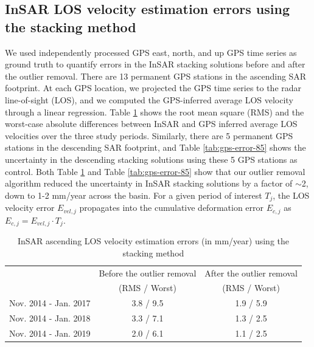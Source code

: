 \documentclass{utexasthesis}
\begin{document}
\subsection{InSAR LOS velocity estimation errors using the stacking method}
\label{sec:error-quant}
We used independently processed GPS east, north, and up GPS time series as ground truth to quantify errors in the InSAR stacking solutions before and after the outlier removal. There are 13 permanent GPS stations in the ascending SAR footprint. At each GPS location, we projected the GPS time series to the radar line-of-sight (LOS), and we computed the GPS-inferred average LOS velocity through a linear regression. Table \ref{tab:gps-error-78} shows the root mean square (RMS) and the worst-case absolute differences between InSAR and GPS inferred average LOS velocities over the three study periods. Similarly, there are 5 permanent GPS stations in the descending SAR footprint, and Table \ref{tab:gps-error-85} shows the uncertainty in the descending stacking solutions using these 5 GPS stations as control. Both Table \ref{tab:gps-error-78} and Table \ref{tab:gps-error-85} show that our outlier removal algorithm reduced the uncertainty in InSAR stacking solutions by a factor of $\sim$2, down to 1-2 mm/year across the basin. For a given period of interest $T_j$, the LOS velocity error $ E_{vel,j} $ propagates into the cumulative deformation error $ E_{c, j} $ as $ E_{c,j} = E_{vel,j} \cdot T_j $. 


\begin{table}
	\caption{InSAR ascending LOS velocity estimation errors (in mm/year) using the stacking method}
	\centering
	\begin{tabular}{|c|c|c|}
		\hline 
		& Before the outlier removal & After the outlier removal \\
		& (RMS / Worst) & (RMS / Worst) \\
		\hline
		Nov. 2014 - Jan. 2017 & 3.8 / 9.5         & 1.9 / 5.9       \\\hline
		Nov. 2014 - Jan. 2018 & 3.3 / 7.1         & 1.3 / 2.5       \\\hline
		Nov. 2014 - Jan. 2019 & 2.0 / 6.1         & 1.1 / 2.5       \\\hline                
	\end{tabular}
	\label{tab:gps-error-78}
\end{table}
\end{document}

